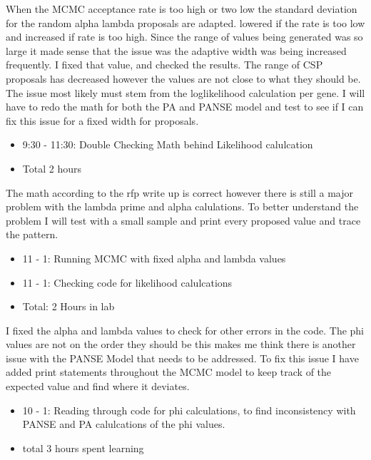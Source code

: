 \documentclass[12pt,hyperref]{labbook}
\begin{document}
When the MCMC acceptance rate is too high or two low the standard deviation for the random alpha lambda proposals are adapted.
lowered if the rate is too low and increased if rate is too high. Since the range of values being generated was so large it made sense that
the issue was the adaptive width was being increased frequently. I fixed that value, and checked the results. The range of CSP proposals has
decreased however the values are not close to what they should be. The issue most likely must stem from the loglikelihood calculation per gene.
I will have to redo the math for both the PA and PANSE model and test to see if I can fix this issue for a fixed width for proposals.
\begin{itemize}
    \item 9:30 - 11:30: Double Checking Math behind Likelihood calulcation
    \item Total 2 hours
\end{itemize}
The math according to the rfp write up is correct however there is still a major problem with the lambda prime and alpha calulations.
To better understand the problem I will test with a small sample and print every proposed value and trace the pattern.
\begin{itemize}
    \item 11 - 1: Running MCMC with fixed alpha and lambda values
    \item 11 - 1: Checking code for likelihood calulcations
    \item Total: 2 Hours in lab
\end{itemize}
I fixed the alpha and lambda values to check for other errors in the code.
The phi values are not on the order they should be this makes me think there is another issue with the PANSE Model that needs to be addressed.
To fix this issue I have added print statements throughout the MCMC model to keep track of the expected value and find where it deviates.
\begin{itemize}
    \item 10 - 1: Reading through code for phi calculations, to find inconsistency with PANSE and PA calulcations of the phi values.
    \item total 3 hours spent learning
\end{itemize}
\end{document}
